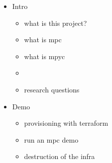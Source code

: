 \begin{itemize}
\tightlist
\item
  Intro

  \begin{itemize}
  \tightlist
  \item
    what is this project?
  \item
    what is mpc
  \item
    what is mpyc
  \item
  \item
    research questions
  \end{itemize}
\item
  Demo

  \begin{itemize}
  \tightlist
  \item
    provisioning with terraform
  \item
    run an mpc demo
  \item
    destruction of the infra
  \end{itemize}
\end{itemize}
